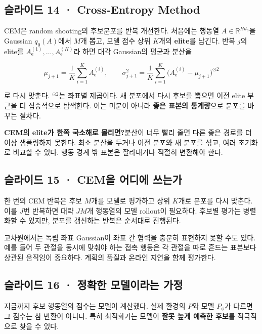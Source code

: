 \documentclass[11pt,a4paper]{article}
\begin{document}
\subsection{슬라이드 14 · Cross-Entropy Method}

CEM은 random shooting의 후보분포를 반복 개선한다. 처음에는 행동열 $A\in\mathbb R^{Hd_a}$을 Gaussian $q_0(A)$에서 $M$개 뽑고, 모델 점수 상위 $K$개의 \textbf{elite}를 남긴다. 반복 $j$의 elite를 $A^{(1)}_{\mathrm e},\ldots,A^{(K)}_{\mathrm e}$라 하면 대각 Gaussian의 평균과 분산을\par

\[
\mu_{j+1}=\frac1K\sum_{i=1}^K A^{(i)}_{\mathrm e},
\qquad
\sigma_{j+1}^2=\frac1K\sum_{i=1}^K
\bigl(A^{(i)}_{\mathrm e}-\mu_{j+1}\bigr)^{\odot2}
\]

로 다시 맞춘다. $^{\odot2}$는 좌표별 제곱이다. 새 분포에서 다시 후보를 뽑으면 이전 elite 부근을 더 집중적으로 탐색한다. 이는 미분이 아니라 \textbf{좋은 표본의 통계량}으로 분포를 바꾸는 절차다.\par

\par\medskip\noindent\textbf{CEM의 elite가 한쪽 국소해로 몰리면?}\quad 분산이 너무 빨리 줄면 다른 좋은 경로를 더 이상 샘플링하지 못한다. 최소 분산을 두거나 이전 분포와 새 분포를 섞고, 여러 초기화로 비교할 수 있다. 행동 경계 밖 표본은 잘라내거나 적절히 변환해야 한다.\par

\subsection{슬라이드 15 · CEM을 어디에 쓰는가}

한 번의 CEM 반복은 후보 $M$개를 모델로 평가하고 상위 $K$개로 분포를 다시 맞춘다. 이를 $J$번 반복하면 대략 $JM$개 행동열의 모델 rollout이 필요하다. 후보별 평가는 병렬화할 수 있지만, 분포를 갱신하는 반복은 순서대로 진행된다.\par

고차원에서는 독립 좌표 Gaussian이 좌표 간 협력을 충분히 표현하지 못할 수도 있다. 예를 들어 두 관절을 동시에 맞춰야 하는 접촉 행동은 각 관절을 따로 흔드는 표본보다 상관된 움직임이 중요하다. 계획의 품질과 온라인 지연을 함께 평가한다.\par

\subsection{슬라이드 16 · 정확한 모델이라는 가정}

지금까지 후보 행동열의 점수는 모델이 계산했다. 실제 환경의 $P$와 모델 $P_\phi$가 다르면 그 점수는 참 반환이 아니다. 특히 최적화기는 모델이 \textbf{잘못 높게 예측한 후보}를 적극적으로 찾을 수 있다.\par
\end{document}
